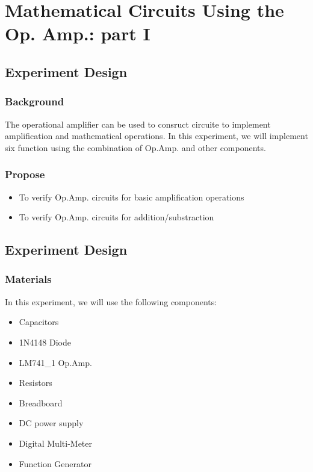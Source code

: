 \section{Mathematical Circuits Using the Op. Amp.: part I}

\subsection{Experiment Design}
    \subsubsection{Background}
    The operational amplifier can be used to consruct circuite to implement amplification and mathematical operations. In this experiment, we will implement six function using the combination of Op.Amp. and other components.\par

    \subsubsection{Propose}
    \begin{itemize}
        \item To verify Op.Amp. circuits for basic amplification operations
        \item To verify Op.Amp. circuits for addition/substraction
    \end{itemize}

\subsection{Experiment Design}
    \subsubsection{Materials}
        In this experiment, we will use the following components:
        \begin{itemize}
            \item Capacitors
            \item 1N4148 Diode
            \item LM741\_1 Op.Amp.
            \item Resistors
            \item Breadboard
            \item DC power supply
            \item Digital Multi-Meter
            \item Function Generator
        \end{itemize}

